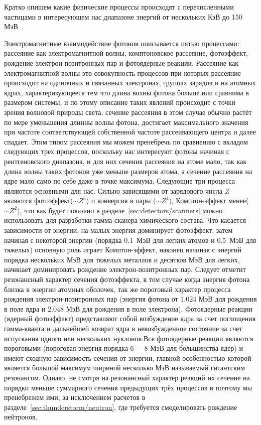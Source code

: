 Кратко опишем какие физические процессы происходят с перечисленными частицами в интересующем нас диапазоне энергий от нескольких КэВ до 150 МэВ~\cite{bespalov2008, kolchuzkin1978, nemec1975,heitler1984quantum, collaboration2016physics}.

Электромагнитные взаимодействие фотонов описывается пятью процессами: рассеяние как электромагнитной волны, комптоновское рассеяние, фотоэффект, рождение электрон-позитронных пар и фотоядерные реакции. Рассеяние как электромагнитной волны это совокупность процессов при которых рассеяние происходит на одиночных и связанных электронах, группах зарядов и на атомных ядрах, характеризующееся тем что длина волны фотона больше или сравнима в размером системы, и по этому описание таких явлений происходит с точки зрения волновой природы света, сечение рассеяния в этом случае обычно растёт по мере уменьшения длинны волны фотона, достигает максимального значения при частоте соответствующей собственной частоте рассеивающего центра и далее спадает. Этим типом рассеяния мы можем пренебречь по сравнению с вкладом следующих трех процессов, поскольку нас интересуют фотоны начиная с рентгеновского диапазона, и для них сечения рассеяния на атоме мало, так как длина волны таких фотонов уже меньше размеров атома, а сечение рассеяния на ядре мало само по себе даже в точке максимума. Следующие три процесса являются основными для нас. Сильно зависящими от зарядового числа $Z$ являются фотоэффект($\sim Z^5$) и конверсия в пары ($\sim Z^4$), Комптон-эффект менее($\sim Z^2$), что как будет показано в разделе~\ref{sec:detectors/scanners} можно использовать для разработки гамма-сканера химического состава, Что касается зависимости от энергии, на малых энергия доминирует фотоэффект, затем начиная с некоторой энергии (порядка 0.1~МэВ для легких атомов и 0.5~МэВ для тяжелых) основную роль играет Комптон-эффект, наконец начиная с энергий порядка нескольких МэВ для тяжелых металлов и десятков МэВ для легких, начинает доминировать рождение электрон-позитронных пар. Следует отметит резонансный характер сечения фотоэффекта, в том случае когда энергия фотона близка к энергии атомных оболочек, так же пороговый характер процесса рождения электрон-позитронных пар (энергия фотона от 1.024 МэВ для рождения в поле ядра и 2.048 МэВ для рождения в поле электрона). Фотоядерные реакции (ядерный фотоэффект) представляют собой возбуждение ядра за счет поглощения гамма-кванта и дальнейшей возврат ядра в невозбужденное состояние за счет испускания одного или нескольких нуклонов.Все фотоядерные реакции являются пороговыми (пороговая энергия порядка 6~--~8 МэВ для большинства ядер) и имеют сходную зависимость сечения от энергии, главной особенностью которой является большой максимум шириной несколько МэВ называемый гигантским резонансом. Однако, не смотря на резонансный характер реакций их сечение на порядки меньше суммарного сечения предыдущих трёх процессов и поэтому мы пренебрежем ими, за исключением расчетов в разделе~\ref{sec:thunderstorm/neutron}, где требуется смоделировать рождение нейтронов.

